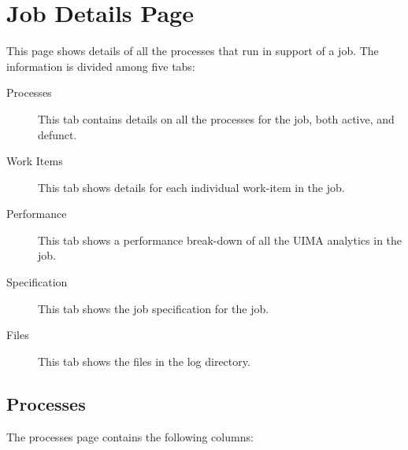 % 
% 
% 
% 
  
    \section{Job Details Page}
    \label{sec:ws-job-details}

    This page shows details of all the processes that run in support of a job. 
    The information is divided among five tabs:
    \begin{description}
      \item[Processes] This tab contains details on all the processes for the job, both
        active, and defunct.
      \item[Work Items] This tab shows details for each individual work-item in the job.
      \item[Performance] This tab shows a performance break-down of all the UIMA analytics
        in the job.
      \item[Specification] This tab shows the job specification for the job.
      \item[Files] This tab shows the files in the log directory.
      \end{description}
      
    \subsection{Processes}
    \label{subsec:ws-processes}
    The processes page contains the following columns:
    
